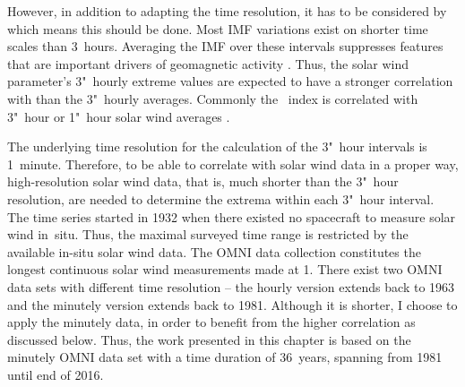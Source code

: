 However, in addition to adapting the time resolution, it has to be considered by which means this should be done. Most IMF variations exist on shorter time scales than 3~hours. Averaging the IMF over these intervals suppresses features that are important drivers of geomagnetic activity \citep{Savani2017}. Thus, the solar wind parameter's 3"~hourly extreme values are expected to have a stronger correlation with \Kp{} than the 3"~hourly averages.
Commonly the \Kp~index is correlated with 3"~hour or 1"~hour solar wind averages \citep[e.g., ][]{Newell2007,Elliott2013,Savani2017}.

The underlying time resolution for the calculation of the 3"~hour \Kp{} intervals is 1~minute. Therefore, to be able to correlate \Kp{} with solar wind data in a proper way, high-resolution solar wind data, that is, much shorter than the 3"~hour resolution, are needed to determine the extrema within each 3"~hour interval.
The \Kp{} time series started in 1932 when there existed no spacecraft to measure solar wind in~situ. Thus, the maximal surveyed time range is restricted by the available in-situ solar wind data.
The OMNI data collection constitutes the longest continuous solar wind measurements made at \SI{1}{\au}. There exist two OMNI data sets with different time resolution -- the hourly version extends back to 1963 and the minutely version extends back to 1981. Although it is shorter, I choose to apply the minutely data, in order to benefit from the higher correlation as discussed below. Thus, the work presented in this chapter is based on the minutely OMNI data set with a time duration of 36~years, spanning from 1981 until end of 2016.

